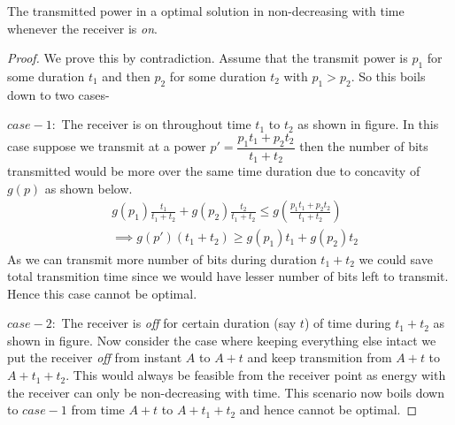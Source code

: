 \begin{lemma}
The transmitted power in a optimal solution in non-decreasing with time whenever the receiver is \textit{on}.
\label{increasing_power}
\end{lemma}
\begin{proof}
We prove this by contradiction. Assume that the transmit power is $p_1$ for some duration $t_1$ and then $p_2$ for some duration $t_2$ with $p_1>p_2$. So this boils down to two cases-

$case-1:$ The receiver is on throughout time $t_1$ to $t_2$ as shown in figure. In this case suppose we transmit at a power $p'=\dfrac{p_1t_1+p_2t_2}{t_1+t_2}$ then the number of bits transmitted would be more over the same time duration due to concavity of $g(p)$ as shown below.
\begin{align}
&g(p_1)\frac{t_1}{t_1+t_2}+g(p_2)\frac{t_2}{t_1+t_2} \le g(\frac{p_1t_1+p_2t_2}{t_1+t_2})
\\
&\implies g(p')(t_1+t_2)\ge g(p_1)t_1+g(p_2)t_2  
\end{align}
As we can transmit more number of bits during duration $t_1+t_2$ we could save total transmition time since we would have lesser number of bits left to transmit. Hence this case cannot be optimal.

$case-2:$ The receiver is \textit{off} for certain duration (say $t$) of time during $t_1+t_2$ as shown in figure. Now consider the case where keeping everything else intact we put the receiver \textit{off} from instant $A$ to $A+t$ and keep transmition from $A+t$ to $A+t_1+t_2$. This would always be feasible from the receiver point as energy with the receiver can only be non-decreasing with time. This scenario now boils down to $case-1$ from time $A+t$ to $A+t_1+t_2$ and hence cannot be optimal.
\end{proof}

